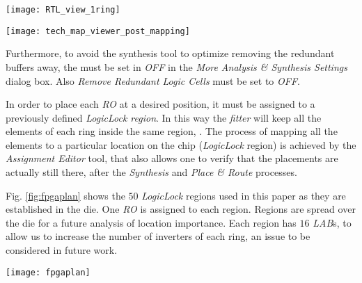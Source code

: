 \begin{figure*}
\begin{center}
\texttt{[image: RTL\_view\_1ring]}
\caption{RTL view one ring with $3$ inverters.}
\label{fig:RTL1ring}
\end{center}
\end{figure*}

\begin{figure*}
\begin{center}
\texttt{[image: tech\_map\_viewer\_post\_mapping]}
\caption{Technology map viewer (post mapping), one ring with $3$
inverters.} \label{fig:postMap1ring}
\end{center}
\end{figure*}

Furthermore, to avoid the synthesis tool to optimize removing the redundant buffers away,
the  must be set in
\emph{OFF} in the \emph{More Analysis \& Synthesis
Settings} dialog box. Also \emph{Remove Redundant Logic Cells}
must be set to \emph{OFF}.

In order to place each \emph{RO} at a desired position, it
must be assigned to a previously defined \emph{LogicLock region}. In this way the \emph{fitter} will keep all the elements of each ring inside the same region,
\cite{LogicLockRegions}. The process of mapping all the elements to a particular location on the chip
(\emph{LogicLock} region) is achieved by the \emph{Assignment
Editor} tool, that also allows one to verify
that the placements are actually still there, after the  \emph{Synthesis} and \emph{Place \& Route} processes.

Fig. \ref{fig:fpgaplan} shows the $50$ \emph{LogicLock} regions used in this paper as they are
established in the die. One \emph{RO} is assigned to each region.
Regions are spread over the die for a future analysis of location importance. Each region has  $16$ \emph{LAB}s, to allow us to increase the number of inverters of each ring, an issue to be considered in future work.


\begin{figure*}
\begin{center}
\texttt{[image: fpgaplan]}
\caption{\emph{Chip Planner} view \emph{LogicLock} regions.}
\label{fig:fpgaplan}
\end{center}
\end{figure*}


